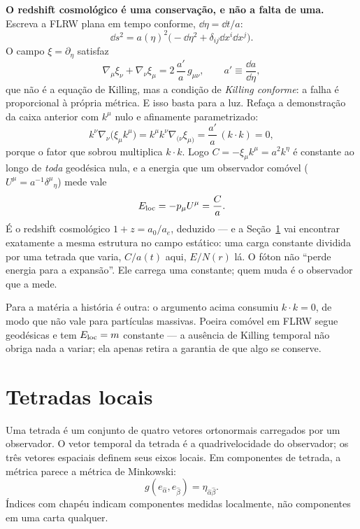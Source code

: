 \documentclass[12pt,a4paper,oneside]{book}
\theoremstyle{rgplain}
\theoremstyle{rgremark}
\begin{document}
\begin{central}
\textbf{O redshift cosmológico é uma conservação, e não a falta de uma.}
Escreva a FLRW plana em tempo conforme, $\dd\eta=\dd t/a$:
\[
  \dd s^2=a(\eta)^2\bigl(-\dd\eta^2+\delta_{ij}\dd x^i\dd x^j\bigr) .
\]
O campo $\xi=\partial_\eta$ satisfaz
\begin{equation}
  \nabla_\mu\xi_\nu+\nabla_\nu\xi_\mu=2\,\frac{a'}{a}\,g_{\mu\nu} ,
  \qquad a'\equiv\frac{\dd a}{\dd\eta} ,
  \label{eq:killing-conforme}
\end{equation}
que não é a equação de Killing, mas a condição de \emph{Killing conforme}: a
falha é proporcional à própria
métrica. E isso basta para a luz. Refaça a demonstração da caixa anterior com
$k^\mu$ nulo e afinamente parametrizado:
\[
  k^\nu\nabla_\nu\bigl(\xi_\mu k^\mu\bigr)
  =k^\mu k^\nu\nabla_{(\nu}\xi_{\mu)}
  =\frac{a'}{a}\,(k\cdot k)=0 ,
\]
porque o fator que sobrou multiplica $k\cdot k$. Logo
$C=-\xi_\mu k^\mu=a^2k^\eta$ é constante ao longo de \emph{toda} geodésica
nula, e a energia que um observador comóvel ($U^\mu=a^{-1}\delta^\mu{}_\eta$)
mede vale
\[
  E_{\rm loc}=-p_\mu U^\mu=\frac{C}{a} .
\]
É o redshift cosmológico $1+z=a_0/a_e$, deduzido --- e a
Seção~\ref{sec:tetradas} vai encontrar exatamente a mesma estrutura no campo
estático: uma carga constante dividida por uma tetrada que varia, $C/a(t)$
aqui, $E/N(r)$ lá. O fóton não ``perde energia para a expansão''. Ele carrega
uma constante; quem muda é o observador que a mede.
\end{central}

Para a matéria a história é outra: o argumento
acima consumiu $k\cdot k=0$, de modo que não vale para partículas massivas.
Poeira comóvel em FLRW segue geodésicas e tem $E_{\rm loc}=m$ constante --- a
ausência de Killing temporal não obriga nada a variar; ela apenas retira a
garantia de que algo se conserve.

\section{Tetradas locais}
\label{sec:tetradas}

Uma tetrada é um conjunto de quatro vetores ortonormais carregados por um
observador. O vetor temporal da tetrada é a quadrivelocidade do observador; os
três vetores espaciais definem seus eixos locais. Em componentes de tetrada, a
métrica parece a métrica de Minkowski:
\[
  g(e_{\hat\alpha},e_{\hat\beta})=\eta_{\hat\alpha\hat\beta}.
\]
Índices com chapéu indicam componentes medidas localmente, não componentes em
uma carta qualquer.
\end{document}
